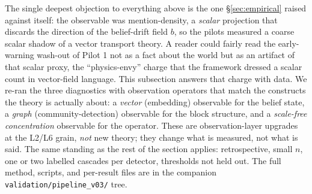 \documentclass[11pt]{article}
\begin{document}
The single deepest objection to everything above is the one \S\ref{sec:empirical} raised against itself: the observable was mention-density, a \emph{scalar} projection that discards the direction of the belief-drift field $b$, so the pilots measured a coarse scalar shadow of a vector transport theory. A reader could fairly read the early-warning wash-out of Pilot 1 not as a fact about the world but as an artifact of that scalar proxy, the ``physics-envy'' charge that the framework dressed a scalar count in vector-field language. This subsection answers that charge with data. We re-ran the three diagnostics with observation operators that match the constructs the theory is actually about: a \emph{vector} (embedding) observable for the belief state, a \emph{graph} (community-detection) observable for the block structure, and a \emph{scale-free concentration} observable for the operator. These are observation-layer upgrades at the L2/L6 grain, \emph{not} new theory; they change what is measured, not what is said. The same standing as the rest of the section applies: retrospective, small $n$, one or two labelled cascades per detector, thresholds not held out. The full method, scripts, and per-result files are in the companion \texttt{validation/pipeline\_v03/} tree.
\end{document}
